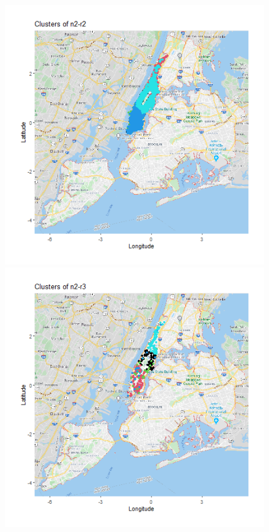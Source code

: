 \documentclass{FR16}
\begin{document}
\begin{figure}[!htb]
\begin{minipage}{0.33\textwidth}
   \end{minipage}
   \begin{minipage}{0.33\textwidth}
     \centering
     \includegraphics[width=1\linewidth]{figures/clust-n2-r2.png}
   \end{minipage}
 \begin{minipage}{0.33\textwidth}
     \centering
     \includegraphics[width=1\linewidth]{figures/clust-n2-r3.png} 

\end{minipage}
\end{figure}
\end{document}
